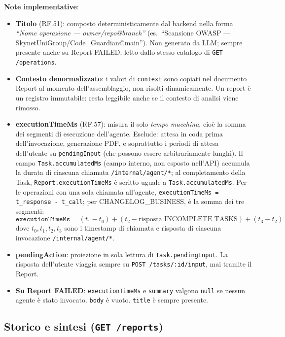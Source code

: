 \documentclass[11pt,a4paper]{article}
\begin{document}
\textbf{Note implementative}:
\begin{itemize}
    \item \textbf{Titolo} (RF.51): composto deterministicamente dal backend nella forma \emph{``Nome operazione --- owner/repo@branch''} (es.\ ``Scansione OWASP --- SkynetUniGroup/Code\_Guardian@main''). Non generato da LLM; sempre presente anche su Report FAILED; letto dallo stesso catalogo di \texttt{GET /operations}.
    \item \textbf{Contesto denormalizzato}: i valori di \texttt{context} sono copiati nel documento Report al momento dell'assemblaggio, non risolti dinamicamente. Un report è un registro immutabile: resta leggibile anche se il contesto di analisi viene rimosso.
    \item \textbf{executionTimeMs} (RF.57): misura il solo \emph{tempo macchina}, cioè la somma dei segmenti di esecuzione dell'agente. Esclude: attesa in coda prima dell'invocazione, generazione PDF, e soprattutto i periodi di attesa dell'utente su \texttt{pendingInput} (che possono essere arbitrariamente lunghi). Il campo \texttt{Task.accumulatedMs} (campo interno, non esposto nell'API) accumula la durata di ciascuna chiamata \texttt{/internal/agent/*}; al completamento della Task, \texttt{Report.executionTimeMs} è scritto uguale a \texttt{Task.accumulatedMs}. Per le operazioni con una sola chiamata all'agente, \texttt{executionTimeMs = t\_response - t\_call}; per CHANGELOG\_BUSINESS, è la somma dei tre segmenti:
    \[
      \texttt{executionTimeMs} = (t_1 - t_0) + (t_2 - \text{risposta INCOMPLETE\_TASKS}) + (t_3 - t_2)
    \]
    dove $t_0, t_1, t_2, t_3$ sono i timestamp di chiamata e risposta di ciascuna invocazione \texttt{/internal/agent/*}.
    \item \textbf{pendingAction}: proiezione in sola lettura di \texttt{Task.pendingInput}. La risposta dell'utente viaggia sempre su \texttt{POST /tasks/:id/input}, mai tramite il Report.
    \item \textbf{Su Report FAILED}: \texttt{executionTimeMs} e \texttt{summary} valgono \texttt{null} se nessun agente è stato invocato. \texttt{body} è vuoto. \texttt{title} è sempre presente.
\end{itemize}

\subsection{Storico e sintesi (\texttt{GET /reports})}
\label{sec:be-report-storico}
\end{document}
